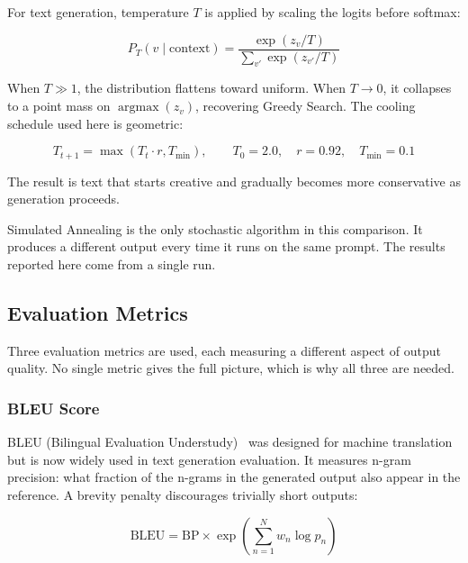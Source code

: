 \documentclass[12pt]{article}
\begin{document}
	For text generation, temperature $T$ is applied by scaling the logits before softmax:
	
	\begin{equation}
		P_T(v \mid \text{context}) = \frac{\exp(z_v / T)}{\sum_{v'} \exp(z_{v'} / T)}
		\label{eq:sa_prob}
	\end{equation}
	
	When $T \gg 1$, the distribution flattens toward uniform. When $T \to 0$, it collapses to a point mass on $\operatorname{argmax}(z_v)$, recovering Greedy Search. The cooling schedule used here is geometric:
	
	\begin{equation}
		T_{t+1} = \max(T_t \cdot r, T_{\min}), \qquad T_0 = 2.0, \quad r = 0.92, \quad T_{\min} = 0.1
		\label{eq:cooling}
	\end{equation}
	
	The result is text that starts creative and gradually becomes more conservative as generation proceeds.
	
	Simulated Annealing is the only stochastic algorithm in this comparison. It produces a different output every time it runs on the same prompt. The results reported here come from a single run.
	
	\subsection{Evaluation Metrics}
	\label{sec:metrics}
	
	Three evaluation metrics are used, each measuring a different aspect of output quality. No single metric gives the full picture, which is why all three are needed.
	
	\subsubsection{BLEU Score}
	
	BLEU (Bilingual Evaluation Understudy)~\cite{papineni2002bleu} was designed for machine translation but is now widely used in text generation evaluation. It measures n-gram precision: what fraction of the n-grams in the generated output also appear in the reference. A brevity penalty discourages trivially short outputs:
	
	\begin{equation}
		\mathrm{BLEU} = \mathrm{BP} \times \exp\!\left(\sum_{n=1}^{N} w_n \log p_n\right)
		\label{eq:bleu}
	\end{equation}
	
\end{document}
